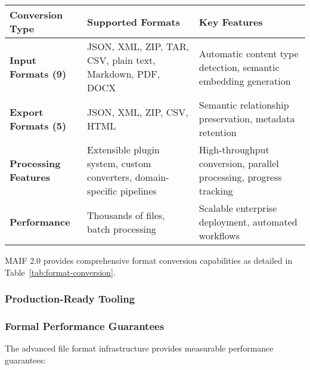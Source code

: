 \documentclass[conference]{IEEEtran}
\begin{document}
\begin{table*}[!t]
\renewcommand{\arraystretch}{1.3}
\caption{MAIF Universal Format Conversion Capabilities}
\label{tab:format-conversion}
\centering
\footnotesize
\begin{tabular}{p{3cm}p{5cm}p{5cm}}
\toprule
\textbf{Conversion Type} & \textbf{Supported Formats} & \textbf{Key Features} \\
\midrule
\textbf{Input Formats (9)} & JSON, XML, ZIP, TAR, CSV, plain text, Markdown, PDF, DOCX & Automatic content type detection, semantic embedding generation \\
\textbf{Export Formats (5)} & JSON, XML, ZIP, CSV, HTML & Semantic relationship preservation, metadata retention \\
\textbf{Processing Features} & Extensible plugin system, custom converters, domain-specific pipelines & High-throughput conversion, parallel processing, progress tracking \\
\textbf{Performance} & Thousands of files, batch processing & Scalable enterprise deployment, automated workflows \\
\bottomrule
\end{tabular}
\end{table*}

MAIF 2.0 provides comprehensive format conversion capabilities as detailed in Table~\ref{tab:format-conversion}.

\subsubsection{Production-Ready Tooling}


\subsubsection{Formal Performance Guarantees}

The advanced file format infrastructure provides measurable performance guarantees:
\end{document}
